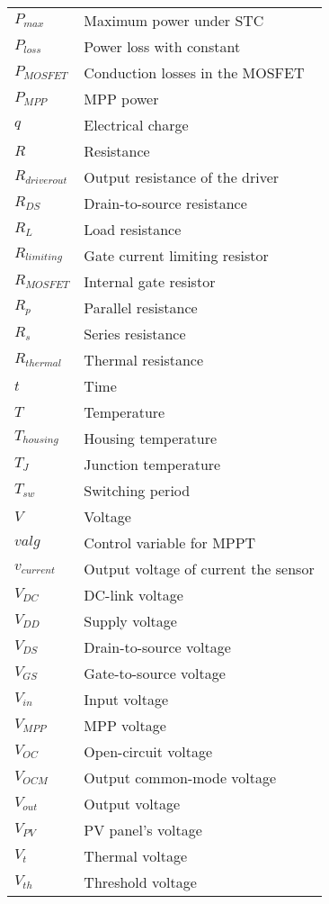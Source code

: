 \begin{tabular}{ll}
$P_{max}$ & Maximum power under STC\\
$P_{loss}$ & Power loss with constant \\
$P_{MOSFET}$ & Conduction losses in the MOSFET \\
$P_{MPP}$ & MPP power \\
$q$ & Electrical charge \\
$R$ & Resistance\\
$R_{driver out}$ & Output resistance of the driver\\
$R_{DS}$ & Drain-to-source resistance\\
$R_{L}$ & Load resistance\\
$R_{limiting}$ & Gate current limiting resistor\\ 
$R_{MOSFET}$ & Internal gate resistor\\
$R_{p}$ & Parallel resistance \\
$R_{s}$ & Series resistance \\
$R_{thermal}$ & Thermal resistance\\
$t$ & Time\\
$T$ & Temperature \\
$T_{housing}$ & Housing temperature \\
$T_{J}$ & Junction temperature \\
$T_{sw}$ & Switching period \\
$V$ & Voltage\\
$valg$ & Control variable for MPPT \\
$v_{current}$ & Output voltage of current the sensor \\
$V_{DC}$ & DC-link voltage \\
$V_{DD}$ & Supply voltage\\
$V_{DS}$ & Drain-to-source voltage\\
$V_{GS}$ & Gate-to-source voltage\\
$V_{in}$ & Input voltage \\
$V_{MPP}$ & MPP voltage\\
$V_{OC}$ & Open-circuit voltage\\
$V_{OCM}$ & Output common-mode voltage \\
$V_{out}$ & Output voltage \\
$V_{PV}$ & PV panel's voltage \\
$V_{t}$ & Thermal voltage \\
$V_{th}$ & Threshold voltage \\
\end{tabular}
